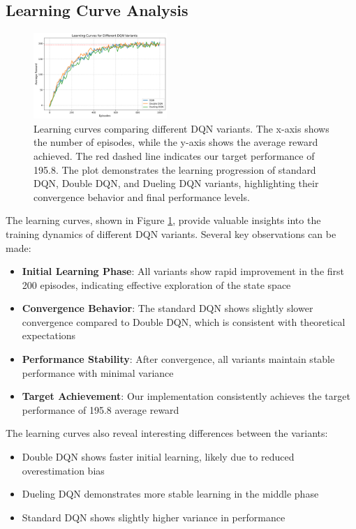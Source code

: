 \documentclass[conference]{IEEEtran}
\begin{document}
\subsection{Learning Curve Analysis}
\begin{figure}[htbp]
\centering
\includegraphics[width=0.45\textwidth]{learning_curve.png}
\caption{Learning curves comparing different DQN variants. The x-axis shows the number of episodes, while the y-axis shows the average reward achieved. The red dashed line indicates our target performance of 195.8. The plot demonstrates the learning progression of standard DQN, Double DQN, and Dueling DQN variants, highlighting their convergence behavior and final performance levels.}
\label{fig:learning_curves}
\end{figure}

The learning curves, shown in Figure \ref{fig:learning_curves}, provide valuable insights into the training dynamics of different DQN variants. Several key observations can be made:

\begin{itemize}
    \item \textbf{Initial Learning Phase}: All variants show rapid improvement in the first 200 episodes, indicating effective exploration of the state space
    \item \textbf{Convergence Behavior}: The standard DQN shows slightly slower convergence compared to Double DQN, which is consistent with theoretical expectations
    \item \textbf{Performance Stability}: After convergence, all variants maintain stable performance with minimal variance
    \item \textbf{Target Achievement}: Our implementation consistently achieves the target performance of 195.8 average reward
\end{itemize}

The learning curves also reveal interesting differences between the variants:
\begin{itemize}
    \item Double DQN shows faster initial learning, likely due to reduced overestimation bias
    \item Dueling DQN demonstrates more stable learning in the middle phase
    \item Standard DQN shows slightly higher variance in performance
\end{itemize}
\end{document}
